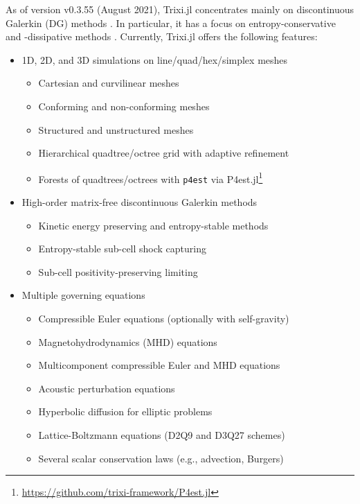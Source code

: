 \documentclass[hidelinks]{juliacon} %
\makeatletter
\newcommand{\eg}[0]{{e.g.\@}\xspace}
\newcommand{\trixi}{Trixi.jl\xspace}
\makeatother
\begin{document}
As of version v0.3.55 (August 2021), \trixi concentrates mainly on discontinuous
Galerkin (DG) methods \cite{hesthaven2007nodal, kopriva2009implementing}.
In particular, it has a focus on entropy-conservative and -dissipative methods
\cite{tadmor1987numerical, lefloch2002fully, fisher2013high,
ranocha2018comparison, chen2017entropy}. Currently, \trixi offers the
following features:
\begin{itemize}
  \item 1D, 2D, and 3D simulations on line/quad/hex/simplex meshes
  \begin{itemize}
    \item Cartesian and curvilinear meshes
    \item Conforming and non-conforming meshes
    \item Structured and unstructured meshes
    \item Hierarchical quadtree/octree grid with adaptive refinement
    \item Forests of quadtrees/octrees with \texttt{p4est} \cite{burstedde2011p4est}
          via P4est.jl\footnote{\url{https://github.com/trixi-framework/P4est.jl}}
  \end{itemize}

  \item High-order matrix-free discontinuous Galerkin methods
  \begin{itemize}
    \item Kinetic energy preserving and entropy-stable methods
    \item Entropy-stable sub-cell shock capturing
    \item Sub-cell positivity-preserving limiting
  \end{itemize}

  \item Multiple governing equations
  \begin{itemize}
    \item Compressible Euler equations (optionally with self-gravity)
    \item Magnetohydrodynamics (MHD) equations
    \item Multicomponent compressible Euler and MHD equations
    \item Acoustic perturbation equations
    \item Hyperbolic diffusion for elliptic problems
    \item Lattice-Boltzmann equations (D2Q9 and D3Q27 schemes)
    \item Several scalar conservation laws (\eg, advection, Burgers)
  \end{itemize}


\end{itemize}
\end{document}
